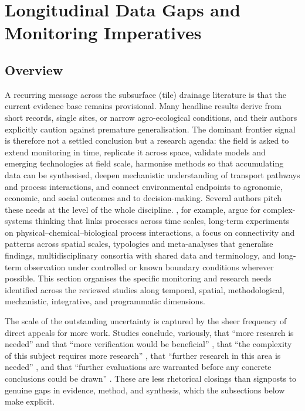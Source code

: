 \documentclass[11pt]{article}
\begin{document}
\section*{Longitudinal Data Gaps and Monitoring Imperatives}

\subsection{Overview}

A recurring message across the subsurface (tile) drainage literature is that the current evidence base remains provisional. Many headline results derive from short records, single sites, or narrow agro-ecological conditions, and their authors explicitly caution against premature generalisation. The dominant frontier signal is therefore not a settled conclusion but a research agenda: the field is asked to extend monitoring in time, replicate it across space, validate models and emerging technologies at field scale, harmonise methods so that accumulating data can be synthesised, deepen mechanistic understanding of transport pathways and process interactions, and connect environmental endpoints to agronomic, economic, and social outcomes and to decision-making. Several authors pitch these needs at the level of the whole discipline. \textcite{Rogger2017}, for example, argue for complex-systems thinking that links processes across time scales, long-term experiments on physical--chemical--biological process interactions, a focus on connectivity and patterns across spatial scales, typologies and meta-analyses that generalise findings, multidisciplinary consortia with shared data and terminology, and long-term observation under controlled or known boundary conditions wherever possible. This section organises the specific monitoring and research needs identified across the reviewed studies along temporal, spatial, methodological, mechanistic, integrative, and programmatic dimensions.

The scale of the outstanding uncertainty is captured by the sheer frequency of direct appeals for more work. Studies conclude, variously, that ``more research is needed'' and that ``more verification would be beneficial'' \parencite{SHALIT1995}, that ``the complexity of this subject requires more research'' \parencite{Malone2014}, that ``further research in this area is needed'' \parencite{Woo2023}, and that ``further evaluations are warranted before any concrete conclusions could be drawn'' \parencite{GUPTA1993}. These are less rhetorical closings than signposts to genuine gaps in evidence, method, and synthesis, which the subsections below make explicit.
\end{document}

